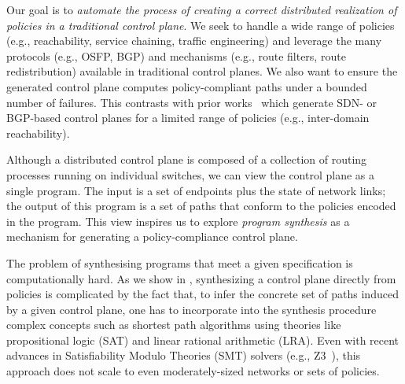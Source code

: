 Our goal is to {\em automate the process of creating a correct distributed
realization of policies in a traditional control plane}. We seek to handle
a wide range of policies (e.g., reachability, service chaining, traffic
engineering) and leverage the many protocols (e.g., OSFP, BGP) and mechanisms
(e.g., route filters, route redistribution) available in traditional control
planes. We also want to ensure the generated control plane computes
policy-compliant paths under a bounded number of failures. This contrasts with
prior works~\cite{netegg, propage} which generate SDN- or BGP-based
control planes for a limited range of policies (e.g., inter-domain
reachability).

Although a distributed control plane is composed of a collection of routing
processes running on individual switches, we can view the control plane as a
single program. The input is a set of endpoints plus the state of network
links; the output of this program is a set of paths that conform to the
policies encoded in the program. This view inspires us to explore {\em program
synthesis} as a mechanism for generating a policy-compliance control plane.



The problem of synthesising programs that meet a given specification
is computationally hard. 
As we show in , synthesizing a control plane
directly from policies is complicated by the fact that, to infer the concrete
set of paths induced by a given control plane, one has to incorporate
into the synthesis procedure complex concepts such as shortest path algorithms
using theories like propositional logic (SAT) and linear rational
arithmetic (LRA). Even with recent advances in Satisfiability Modulo Theories
(SMT) solvers (e.g., Z3~\cite{z3}), this approach does not scale to
even moderately-sized networks or sets of policies.

